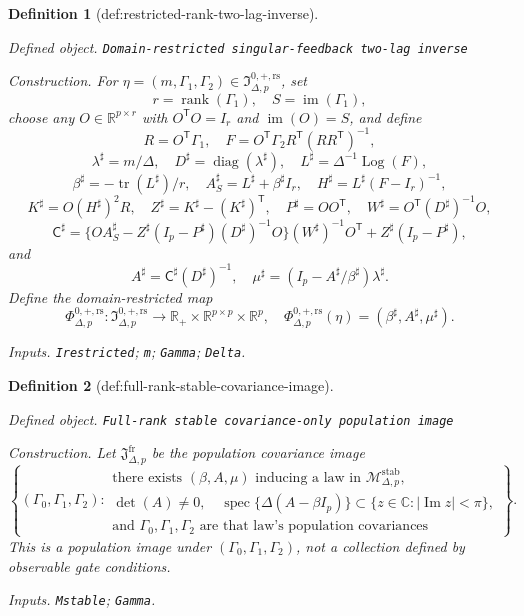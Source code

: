 \documentclass{article}
\newtheorem{definition}{Definition}
\begin{document}
\begin{definition}[def:restricted-rank-two-lag-inverse]\label{def:restricted-rank-two-lag-inverse}
\par\smallskip\noindent\emph{Defined object.} \texttt{Domain-\allowbreak{}restricted singular-\allowbreak{}feedback two-\allowbreak{}lag inverse}
\par\smallskip\noindent\emph{Construction.} For \(\eta=(m,\Gamma_1,\Gamma_2)\in\mathfrak I_{\Delta,p}^{0,+,\mathrm{rs}}\), set
\[
 r=\operatorname{rank}(\Gamma_1),\quad S=\operatorname{im}(\Gamma_1),
\]
choose any \(O\in\mathbb R^{p\times r}\) with \(O^{\mathsf T}O=I_r\) and \(\operatorname{im}(O)=S\), and define
\[
 R=O^{\mathsf T}\Gamma_1,\quad
 F=O^{\mathsf T}\Gamma_2R^{\mathsf T}(RR^{\mathsf T})^{-1},
\]
\[
 \lambda^\sharp=m/\Delta,\quad D^\sharp=\operatorname{diag}(\lambda^\sharp),
 \quad L^\sharp=\Delta^{-1}\operatorname{Log}(F),
\]
\[
 \beta^\sharp=-\operatorname{tr}(L^\sharp)/r,\quad
 A_S^\sharp=L^\sharp+\beta^\sharp I_r,\quad
 H^\sharp=L^\sharp(F-I_r)^{-1},
\]
\[
 K^\sharp=O(H^\sharp)^2R,\quad
 Z^\sharp=K^\sharp-(K^\sharp)^{\mathsf T},\quad
 P^\sharp=OO^{\mathsf T},\quad
 W^\sharp=O^{\mathsf T}(D^\sharp)^{-1}O,
\]
\[
 \mathsf C^\sharp=
 \{OA_S^\sharp-Z^\sharp(I_p-P^\sharp)(D^\sharp)^{-1}O\}
 (W^\sharp)^{-1}O^{\mathsf T}+Z^\sharp(I_p-P^\sharp),
\]
and
\[
 A^\sharp=\mathsf C^\sharp(D^\sharp)^{-1},\quad
 \mu^\sharp=(I_p-A^\sharp/\beta^\sharp)\lambda^\sharp.
\]
Define the domain-restricted map
\[
 \Phi_{\Delta,p}^{0,+,\mathrm{rs}}:\mathfrak I_{\Delta,p}^{0,+,\mathrm{rs}}
 \longrightarrow\mathbb R_+\times\mathbb R^{p\times p}\times\mathbb R^p,
 \quad
 \Phi_{\Delta,p}^{0,+,\mathrm{rs}}(\eta)
 =(\beta^\sharp,A^\sharp,\mu^\sharp).
\]
\par\smallskip\noindent\emph{Inputs.} \texttt{Irestricted}; \texttt{m}; \texttt{Gamma}; \texttt{Delta}.
\end{definition}

\begin{definition}[def:full-rank-stable-covariance-image]\label{def:full-rank-stable-covariance-image}
\par\smallskip\noindent\emph{Defined object.} \texttt{Full-\allowbreak{}rank stable covariance-\allowbreak{}only population image}
\par\smallskip\noindent\emph{Construction.} Let \(\mathfrak J_{\Delta,p}^{\mathrm{fr}}\) be the population covariance image
\[
 \left\{(\Gamma_0,\Gamma_1,\Gamma_2):\begin{array}{l}
 \text{there exists }(\beta,A,\mu)\text{ inducing a law in }\mathcal M_{\Delta,p}^{\mathrm{stab}},\\
 \det(A)\neq0,\quad
 \operatorname{spec}\{\Delta(A-\beta I_p)\}
 \subset\{z\in\mathbb C:|\operatorname{Im}z|<\pi\},\\
 \text{and }\Gamma_0,\Gamma_1,\Gamma_2\text{ are that law's population covariances}
 \end{array}\right\}.
\]
This is a population image under \((\Gamma_0,\Gamma_1,\Gamma_2)\), not a collection defined by observable gate conditions.
\par\smallskip\noindent\emph{Inputs.} \texttt{Mstable}; \texttt{Gamma}.
\end{definition}
\end{document}
